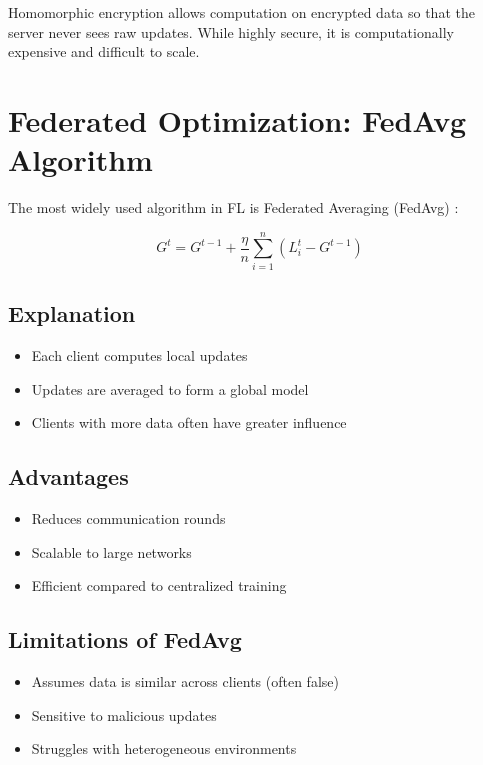 Homomorphic encryption allows computation on encrypted data so that the server never sees raw updates. While highly secure, it is computationally expensive and difficult to scale.

\section{Federated Optimization: FedAvg Algorithm}

The most widely used algorithm in FL is Federated Averaging (FedAvg) \cite{mcmahan2017communication}:

\begin{equation}
    G^{t} = G^{t-1} + \frac{\eta}{n} \sum_{i=1}^{n} \left( L_i^{t} - G^{t-1} \right)
    \label{eq:fedavg}
\end{equation}

\subsection{Explanation}
\begin{itemize}
    \item Each client computes local updates
    \item Updates are averaged to form a global model
    \item Clients with more data often have greater influence
\end{itemize}

\subsection{Advantages}
\begin{itemize}
    \item Reduces communication rounds
    \item Scalable to large networks
    \item Efficient compared to centralized training
\end{itemize}

\subsection{Limitations of FedAvg}
\begin{itemize}
    \item Assumes data is similar across clients (often false)
    \item Sensitive to malicious updates
    \item Struggles with heterogeneous environments
\end{itemize}
